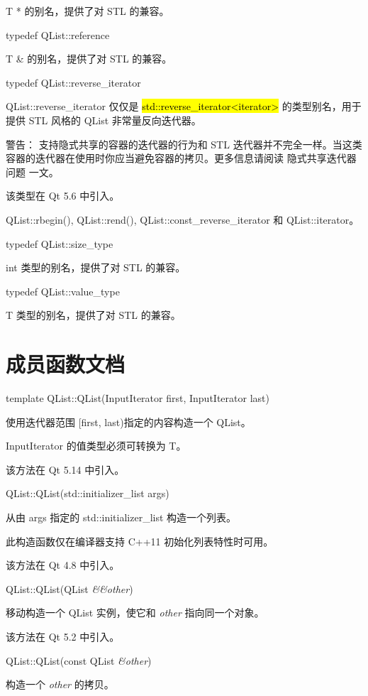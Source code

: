 T * 的别名，提供了对 STL 的兼容。

typedef QList::reference

T \& 的别名，提供了对 STL 的兼容。

typedef QList::reverse\_iterator

QList::reverse\_iterator 仅仅是 \hl{std::reverse\_iterator<iterator>} 的类型别名，用于提供 STL 风格的 QList 非常量反向迭代器。

\begin{notice}
警告： 支持隐式共享的容器的迭代器的行为和 STL 迭代器并不完全一样。当这类容器的迭代器在使用时你应当避免容器的拷贝。更多信息请阅读 隐式共享迭代器问题 一文。
\end{notice}

该类型在 Qt 5.6 中引入。

\begin{seeAlso}
QList::rbegin(), QList::rend(), QList::const\_reverse\_iterator 和 QList::iterator。
\end{seeAlso}

typedef QList::size\_type

int 类型的别名，提供了对 STL 的兼容。

typedef QList::value\_type

T 类型的别名，提供了对 STL 的兼容。

\section{成员函数文档}

template QList::QList(InputIterator first, InputIterator last)

使用迭代器范围 [first, last)指定的内容构造一个 QList。

InputIterator 的值类型必须可转换为 T。

该方法在 Qt 5.14 中引入。

QList::QList(std::initializer\_list args)

从由 args 指定的 std::initializer\_list 构造一个列表。

此构造函数仅在编译器支持 C++11 初始化列表特性时可用。

该方法在 Qt 4.8 中引入。

QList::QList(QList \emph{\&\&other})

移动构造一个 QList 实例，使它和 \emph{other} 指向同一个对象。

该方法在 Qt 5.2 中引入。

QList::QList(const QList \emph{\&other})

构造一个 \emph{other} 的拷贝。

